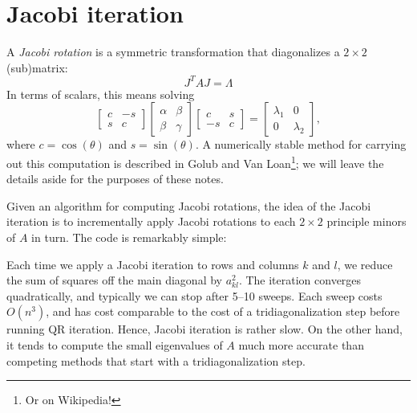 \section{Jacobi iteration}

A {\em Jacobi rotation} is a symmetric transformation that
diagonalizes a $2 \times 2$ (sub)matrix:
\[
  J^T A J = \Lambda
\]
In terms of scalars, this means solving
\[
  \begin{bmatrix} c & -s \\ s & c \end{bmatrix}
  \begin{bmatrix} \alpha & \beta \\ \beta & \gamma \end{bmatrix}
  \begin{bmatrix} c & s \\ -s & c \end{bmatrix} =
  \begin{bmatrix} \lambda_1 & 0 \\ 0 & \lambda_2 \end{bmatrix},
\]
where $c = \cos(\theta)$ and $s = \sin(\theta)$.  A numerically
stable method for carrying out this computation is described in
Golub and Van Loan\footnote{Or on Wikipedia!}; we will leave
the details aside for the purposes of these notes.

Given an algorithm for computing Jacobi rotations, the idea
of the Jacobi iteration is to incrementally apply Jacobi rotations
to each $2 \times 2$ principle minors of $A$ in turn.  The code is
remarkably simple:



Each time we apply a Jacobi iteration to rows and columns $k$ and $l$,
we reduce the sum of squares off the main diagonal by $a_{kl}^2$. The
iteration converges quadratically, and typically we can stop after 5--10
sweeps.  Each sweep costs $O(n^3)$, and has cost comparable to the cost
of a tridiagonalization step before running QR iteration.  Hence, Jacobi
iteration is rather slow.  On the other hand, it tends to compute the
small eigenvalues of $A$ much more accurate than competing methods that
start with a tridiagonalization step.

